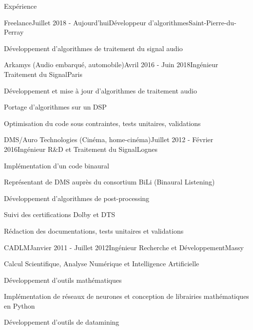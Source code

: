 \documentclass{resume} %
\begin{document}
	
\begin{rSection}{Expérience}

\begin{rSubsection}{Freelance}{Juillet 2018 - Aujourd'hui}{Développeur d'algorithmes}{Saint-Pierre-du-Perray}
\item Développement d'algorithmes de traitement du signal audio
\end{rSubsection}


\begin{rSubsection}{Arkamys (Audio embarqué, automobile)}{Avril 2016 - Juin 2018}{Ingénieur Traitement du Signal}{Paris}
\item Développement et mise à jour d'algorithmes de traitement audio
\item Portage d'algorithmes sur un DSP
\item Optimisation du code sous contraintes, tests unitaires, validations
\end{rSubsection}


\begin{rSubsection}{DMS/Auro Technologies (Cinéma, home-cinéma)}{Juillet 2012 - Février 2016}{Ingénieur R\&D et Traitement du Signal}{Lognes}
\item Implémentation d'un code binaural
\item Représentant de DMS auprès du consortium BiLi (Binaural Listening)
\item Développement d'algorithmes de post-processing
\item Suivi des certifications Dolby et DTS
\item Rédaction des documentations, tests unitaires et validations
\end{rSubsection}


\begin{rSubsection}{CADLM}{Janvier 2011 - Juillet 2012}{Ingénieur Recherche et Développement}{Massy}
\item Calcul Scientifique, Analyse Numérique et Intelligence Artificielle
\item Développement d'outils mathématiques
\item Implémentation de réseaux de neurones et conception de librairies mathématiques en Python
\item Développement d'outils de datamining
\end{rSubsection}


\end{rSection}
\end{document}
